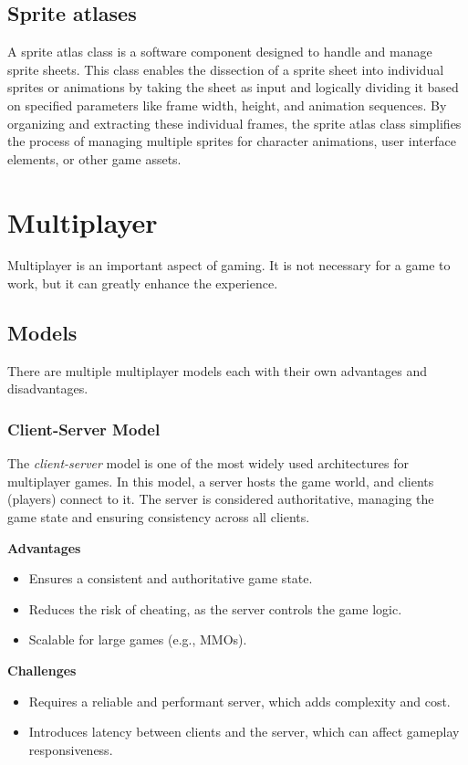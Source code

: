 \documentclass{article} %
\begin{document}
\subsection{Sprite atlases}
A sprite atlas class is a software component designed to handle and manage sprite sheets.
This class enables the dissection of a sprite sheet into individual sprites or animations by taking the sheet as input and logically dividing it based on specified parameters like frame width, height, and animation sequences.
By organizing and extracting these individual frames, the sprite atlas class simplifies the process of managing multiple sprites for character animations, user interface elements, or other game assets.

\newpage

\section{Multiplayer}
Multiplayer is an important aspect of gaming. It is not necessary for a game to work, but it can greatly enhance the experience.
\subsection{Models}
There are multiple multiplayer models each with their own advantages and disadvantages. \cite{Kroupp_2024}

\subsubsection{Client-Server Model}
The \textit{client-server} model is one of the most widely used architectures for multiplayer games. In this model, a server hosts the game world, and clients (players) connect to it. The server is considered authoritative, managing the game state and ensuring consistency across all clients.

\textbf{Advantages}
\begin{itemize}
	\item Ensures a consistent and authoritative game state.
	\item Reduces the risk of cheating, as the server controls the game logic.
	\item Scalable for large games (e.g., MMOs).
\end{itemize}

\textbf{Challenges}
\begin{itemize}
	\item Requires a reliable and performant server, which adds complexity and cost.
	\item Introduces latency between clients and the server, which can affect gameplay responsiveness.
\end{itemize}
\end{document}
